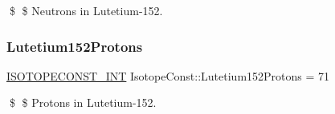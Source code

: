 \$ \$ Neutrons in Lutetium-\/152. \mbox{\label{group___isotope_const-_lutetium-_lu152_ga7055fe6e51bae41cbf70bf731f678fe6}} 
\subsubsection{\texorpdfstring{Lutetium152\+Protons}{Lutetium152Protons}}
{\footnotesize\ttfamily \mbox{\hyperlink{group___isotope_const-_macros_ga5f18360b3e99483a35c32d789e62621c}{I\+S\+O\+T\+O\+P\+E\+C\+O\+N\+S\+T\+\_\+\+I\+NT}} Isotope\+Const\+::\+Lutetium152\+Protons = 71}

\$ \$ Protons in Lutetium-\/152. 
